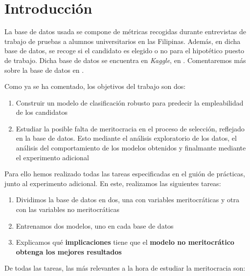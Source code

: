 \section{Introducción}

La base de datos usada se compone de métricas recogidas durante entrevistas de trabajo de pruebas a alumnos universitarios en las Filipinas. Además, en dicha base de datos, se recoge si el candidato es elegido o no para el hipotético puesto de trabajo. Dicha base de datos se encuentra en \textit{Kaggle}, en \cite{database:online}. Comentaremos más sobre la base de datos en .

Como ya se ha comentado, los objetivos del trabajo son dos:

\begin{enumerate}
    \item Construir un modelo de clasificación robusto para predecir la empleabilidad de los candidatos
    \item Estudiar la posible falta de meritocracia en el proceso de selección, reflejado en la base de datos. Esto mediante el análisis exploratorio de los datos, el análisis del comportamiento de los modelos obtenidos y finalmante mediante el experimento adicional
\end{enumerate}

Para ello hemos realizado todas las tareas especificadas en el guión de prácticas, junto al experimento adicional. En este, realizamos las siguientes tareas:

\begin{enumerate}
    \item Dividimos la base de datos en dos, una con variables meritocráticas y otra con las variables no meritocráticas \footnotemark
    \item Entrenamos dos modelos, uno en cada base de datos
    \item Explicamos qué \textbf{implicaciones} tiene que el \textbf{modelo no meritocrático obtenga los mejores resultados}
\end{enumerate}


De todas las tareas, las más relevantes a la hora de estudiar la meritocracia son:

